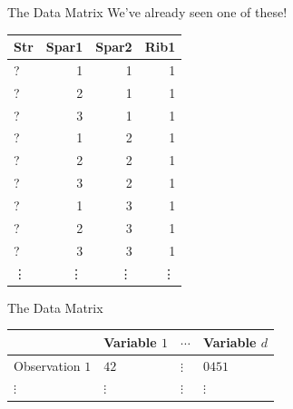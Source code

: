 \documentclass[14pt]{beamer}
\begin{document}

\begin{frame}{The Data Matrix}
  We've already seen one of these!

  \begin{table}
    \begin{tabular}{l|r|r|r}
      \hline
      Str & Spar1 & Spar2 & Rib1\\
      \hline
      ? & 1 & 1 & 1\\
      \hline
      ? & 2 & 1 & 1\\
      \hline
      ? & 3 & 1 & 1\\
      \hline
      ? & 1 & 2 & 1\\
      \hline
      ? & 2 & 2 & 1\\
      \hline
      ? & 3 & 2 & 1\\
      \hline
      ? & 1 & 3 & 1\\
      \hline
      ? & 2 & 3 & 1\\
      \hline
      ? & 3 & 3 & 1\\
      \hline
      \vdots & \vdots & \vdots & \vdots
    \end{tabular}
  \end{table}
\end{frame}

\begin{frame}{The Data Matrix}
  \begin{table}
    \begin{tabular}{@{}l|l|l|l@{}}
                      & Variable $1$ & $\cdots$ & Variable $d$ \\
      \hline
      Observation $1$ & $42$         & $\vdots$ & $0451$ \\
      $\vdots$        & $\vdots$     & $\vdots$ & $\vdots$
    \end{tabular}
  \end{table}
\end{frame}
\end{document}
